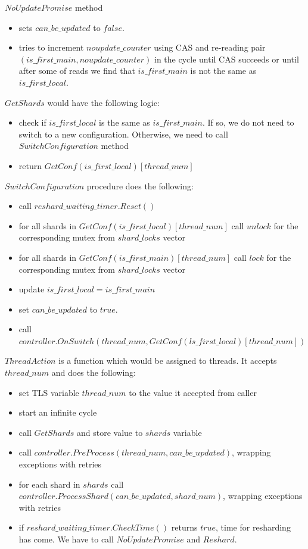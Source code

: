 \documentclass{article}
\begin{document}
$NoUpdatePromise$ method
\begin{itemize}
	\item sets $can\_be\_updated$ to $false$.
	\item tries to increment $noupdate\_counter$ using CAS and re-reading pair $(is\_first\_main, noupdate\_counter)$ in the cycle until CAS succeeds or until after some of reads we find that $is\_first\_main$ is not the same as $is\_first\_local$.
\end{itemize}

$GetShards$ would have the following logic:
\begin{itemize}
	\item check if $is\_first\_local$ is the same as $is\_first\_main$. If so, we do not need to switch to a new configuration. Otherwise, we need to call $SwitchConfiguration$ method
	\item return $GetConf(is\_first\_local)[thread\_num]$
\end{itemize}

$SwitchConfiguration$ procedure does the following:
\begin{itemize}
	\item call $reshard\_waiting\_timer.Reset()$
	\item for all shards in $GetConf(is\_first\_local)[thread\_num]$ call $unlock$ for the corresponding mutex from $shard\_locks$ vector
	\item for all shards in $GetConf(is\_first\_main)[thread\_num]$ call $lock$ for the corresponding mutex from $shard\_locks$ vector
	\item update $is\_first\_local = is\_first\_main$
	\item set $can\_be\_updated$ to $true$.
	\item call $controller.OnSwitch(thread\_num, GetConf(ls\_first\_local)[thread\_num])$
\end{itemize}

$ThreadAction$ is a function which would be assigned to threads. It accepts $thread\_num$ and does the following:
\begin{itemize}
	\item set TLS variable $thread\_num$ to the value it accepted from caller
	\item start an infinite cycle
	\item call $GetShards$ and store value to $shards$ variable
	\item call $controller.PreProcess(thread\_num, can\_be\_updated)$, wrapping exceptions with retries
	\item for each shard in $shards$ call $controller.ProcessShard(can\_be\_updated, shard\_num)$, wrapping exceptions with retries
	\item if $reshard\_waiting\_timer.CheckTime()$ returns $true$, time for resharding has come. We have to call $NoUpdatePromise$ and $Reshard$.
\end{itemize}
\end{document}
